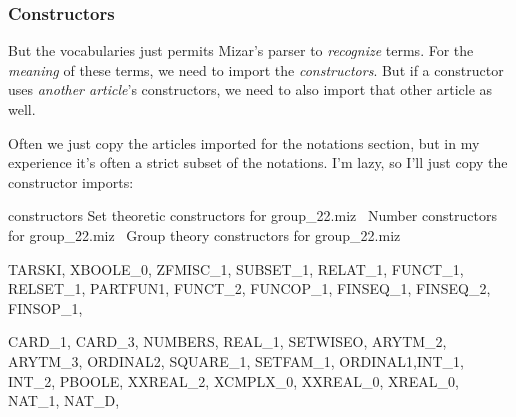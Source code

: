 \subsubsection{Constructors}
But the vocabularies just permits Mizar's parser to \emph{recognize}
terms. For the \emph{meaning} of these terms, we need to import the
\emph{constructors}. But if a constructor uses \emph{another article}'s
constructors, we need to also import that other article as well.

Often we just copy the articles imported for the notations section, but
in my experience it's often a strict subset of the notations. I'm lazy,
so I'll just copy the constructor imports:

\nwenddocs{}\endmoddef\nwstartdeflinemarkup{}\nwenddeflinemarkup
constructors \LA{}Set theoretic constructors for \code{}group{\_}22.miz\edoc{}~{\nwtagstyle{}}\RA{}
  \LA{}Number constructors for \code{}group{\_}22.miz\edoc{}~{\nwtagstyle{}}\RA{}
  \LA{}Group theory constructors for \code{}group{\_}22.miz\edoc{}~{\nwtagstyle{}}\RA{}
\nwendcode{}\nwdocspar

\nwenddocs{}\endmoddef\nwstartdeflinemarkup{}\nwenddeflinemarkup
TARSKI, XBOOLE_0, ZFMISC_1, SUBSET_1, RELAT_1, FUNCT_1,
RELSET_1, PARTFUN1, FUNCT_2, FUNCOP_1, FINSEQ_1, FINSEQ_2, FINSOP_1,
\nwendcode{}\nwdocspar

\nwenddocs{}\endmoddef\nwstartdeflinemarkup{}\nwenddeflinemarkup
CARD_1, CARD_3, NUMBERS, REAL_1, SETWISEO,
ARYTM_2, ARYTM_3, ORDINAL2, SQUARE_1,
SETFAM_1, ORDINAL1,INT_1, INT_2, PBOOLE,
XXREAL_2, XCMPLX_0, XXREAL_0, XREAL_0,  NAT_1, NAT_D,
\nwendcode{}\nwdocspar

